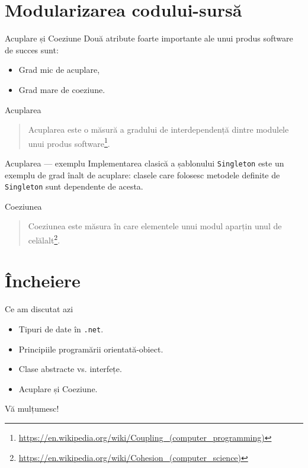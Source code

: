 \documentclass[presentation]{beamer}
\begin{document}
\section{Modularizarea codului-sursă}
\label{sec:org83d0346}
\begin{frame}[label={sec:org976a385}]{Acuplare și Coeziune}
Două atribute foarte importante ale unui produs software de succes sunt:
\begin{itemize}
\item Grad mic de acuplare,
\item Grad mare de coeziune.
\end{itemize}
\end{frame}
\begin{frame}[label={sec:org8daeb39}]{Acuplarea}
\begin{quotation} %
\alert{Acuplarea} este o măsură a gradului de interdependență dintre modulele unui produs software\footnote{\url{https://en.wikipedia.org/wiki/Coupling\_(computer\_programming)}}.
\end{quotation}
\end{frame}
\begin{frame}[label={sec:org934f8f6},fragile]{Acuplarea --- exemplu}
 Implementarea clasică a șablonului \texttt{Singleton} este un exemplu de grad înalt de acuplare: clasele care folosesc metodele definite de \texttt{Singleton} sunt dependente de acesta.
\end{frame}
\begin{frame}[label={sec:org2b86433}]{Coeziunea}
\begin{quotation} %
\alert{Coeziunea} este măsura în care elementele unui modul aparțin unul de celălalt\footnote{\url{https://en.wikipedia.org/wiki/Cohesion\_(computer\_science)}}.
\end{quotation}
\end{frame}
\section{Încheiere}
\label{sec:orgda7319c}
\begin{frame}[label={sec:orgc949043},fragile]{Ce am discutat azi}
 \begin{itemize}
\item Tipuri de date în \texttt{.net}.
\item Principiile programării orientată-obiect.
\item Clase abstracte vs. interfețe.
\item Acuplare și Coeziune.
\end{itemize}
\end{frame}
\begin{frame}[label={sec:org517a0f1}]{Vă mulțumesc!}
\end{frame}
\end{document}
